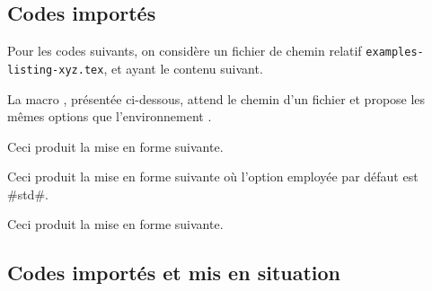 \documentclass[theme = color]{tutodoc}
\begin{document}
\subsection{Codes importés}

Pour les codes suivants, on considère un fichier de chemin relatif \verb+examples-listing-xyz.tex+, et ayant le contenu suivant.




\medskip


La macro , présentée ci-dessous, attend le chemin d'un fichier et propose les mêmes options que l'environnement .


\begin{tdocexa}
    \leavevmode

    \begin{tdoclatex}[code]
    \end{tdoclatex}

    Ceci produit la mise en forme suivante.

\end{tdocexa}


\begin{tdocexa}[À la suite]
    \leavevmode

    \begin{tdoclatex}[code]
    \end{tdoclatex}

    Ceci produit la mise en forme suivante où l'option employée par défaut est \tdocinlatex#std#.

\end{tdocexa}


\begin{tdocexa}
    \leavevmode

    \begin{tdoclatex}[code]
    \end{tdoclatex}

    Ceci produit la mise en forme suivante.

\end{tdocexa}



\subsection{Codes importés et mis en situation}
\label{tutodoc-latexshow}
\end{document}
